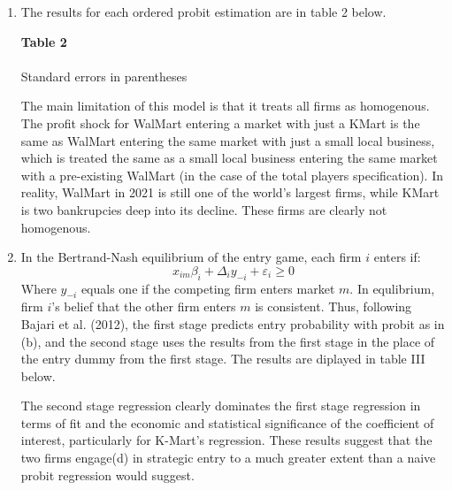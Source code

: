 \documentclass{article}
\begin{document}
\begin{enumerate}

    \item The results for each ordered probit estimation are in table 2 below.
    \begin{center}
        \textbf{Table 2} \\ \medskip
         \\ \smallskip 
        \footnotesize{Standard errors in parentheses}
    \end{center}
    The main limitation of this model is that it treats all firms as homogenous. The profit shock for WalMart entering a market with just a KMart is the same as WalMart entering the same market with just a small local business, which is treated the same as a small local business entering the same market with a pre-existing WalMart (in the case of the total players specification). In reality, WalMart in 2021 is still one of the world's largest firms, while KMart is two bankrupcies deep into its decline. These firms are clearly not homogenous.

    \item In the Bertrand-Nash equilibrium of the entry game, each firm $i$ enters if:\[
      x_{im}\beta_i + \Delta_iy_{-i} + \varepsilon_i\geq 0
    \]
    Where $y_{-i}$ equals one if the competing firm enters market $m$. In equlibrium, firm $i$'s belief that the other firm enters $m$ is consistent. Thus, following Bajari et al. (2012), the first stage predicts entry probability with probit as in (b), and the second stage uses the results from the first stage in the place of the entry dummy from the first stage. The results are diplayed in table III below. 
    \begin{center}
      
    \end{center}
    The second stage regression clearly dominates the first stage regression in terms of fit and the economic and statistical significance of the coefficient of interest, particularly for K-Mart's regression. These results suggest that the two firms engage(d) in strategic entry to a much greater extent than a naive probit regression would suggest.
\end{enumerate}
\end{document}
